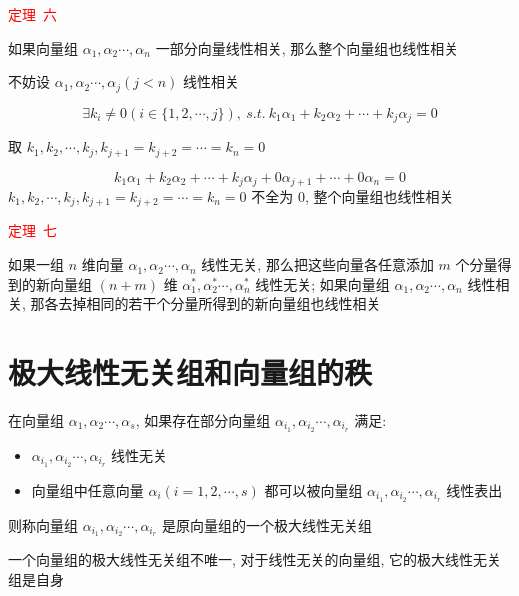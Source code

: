 \begin{theorem}[判别线性相关性的七大定理]
	\textcolor{red}{定理\ 六}
	
	如果向量组 $\alpha_{1},\alpha_{2}\cdots,\alpha_{n}$ 一部分向量线性相关, 那么整个向量组也线性相关
	
	\begin{anymark}[证明]
		不妨设 $\alpha_{1},\alpha_{2}\cdots,\alpha_{j}(j< n)$ 线性相关  
		
		$$\exists k_{i}\neq 0(i\in\{1,2,\cdots,j\}),\ s.t. \ k_{1}\alpha_{1}+k_{2}\alpha_{2}+\cdots+k_{j}\alpha_{j}=0$$
		 
		取 $k_{1},k_{2},\cdots,k_{j},k_{j+1} = k_{j+2} = \cdots = k_{n} = 0$

		$$k_{1}\alpha_{1}+k_{2}\alpha_{2}+\cdots+k_{j}\alpha_{j} + 0\alpha_{j+1} + \cdots + 0\alpha_{n}=0$$
		$k_{1},k_{2},\cdots,k_{j},k_{j+1}=k_{j+2}=\cdots=k_{n}=0$ 不全为 $0$, 整个向量组也线性相关
	\end{anymark}
	
	\textcolor{red}{定理\ 七}
	
	如果一组 $n$ 维向量 $\alpha_{1},\alpha_{2}\cdots,\alpha_{n}$ 线性无关,
	那么把这些向量各任意添加 $m$ 个分量得到的新向量组 $(n+m)$ 维 $\alpha_{1}^{*},\alpha_{2}^{*}\cdots,\alpha_{n}^{*}$ 线性无关;
	如果向量组 $\alpha_{1},\alpha_{2}\cdots,\alpha_{n}$ 线性相关, 那各去掉相同的若干个分量所得到的新向量组也线性相关
\end{theorem}

\section{极大线性无关组和向量组的秩}
\begin{definition}[极大线性无关组]
	在向量组 $\alpha_{1},\alpha_{2}\cdots,\alpha_{s}$, 如果存在部分向量组 $\alpha_{i_{1}},\alpha_{i_{2}}\cdots,\alpha_{i_{r}}$ 满足:  
	\begin{itemize}
		\item $\alpha_{i_{1}},\alpha_{i_{2}}\cdots,\alpha_{i_{r}}$ 线性无关
		\item 向量组中任意向量 $\alpha_{i}(i=1,2,\cdots,s)$ 都可以被向量组 $\alpha_{i_{1}},\alpha_{i_{2}}\cdots,\alpha_{i_{r}}$ 线性表出
	\end{itemize}
	则称向量组 $\alpha_{i_{1}},\alpha_{i_{2}}\cdots,\alpha_{i_{r}}$ 是原向量组的一个极大线性无关组
	
	一个向量组的极大线性无关组不唯一, 对于线性无关的向量组, 它的极大线性无关组是自身
\end{definition}

